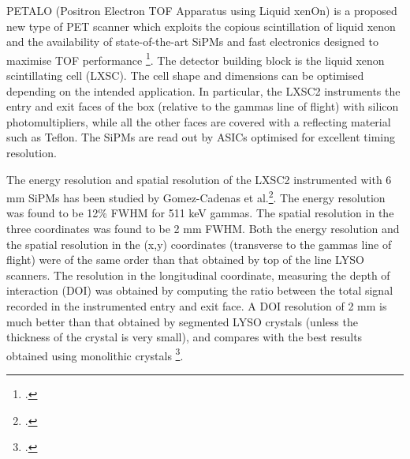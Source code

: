 
PETALO (Positron Electron TOF Apparatus using Liquid xenOn) is a proposed new type of PET scanner which exploits the copious scintillation of liquid xenon and the availability of state-of-the-art SiPMs and fast electronics designed to maximise TOF performance \footcite{Petalo2015}. The detector building block is the liquid xenon scintillating cell (LXSC). The cell shape and dimensions can be optimised depending on the intended application. In particular, the LXSC2 instruments the entry and exit faces of the box (relative to the gammas line of flight) with silicon photomultipliers, while all the other faces are covered with a reflecting material such as Teflon. The SiPMs are read out by ASICs optimised for excellent timing resolution. 
%

The energy resolution and spatial resolution of the LXSC2 instrumented with 6 mm SiPMs has been studied
by Gomez-Cadenas et al.\footcite{Petalo2015}. The energy resolution was found to be 12\% FWHM for 511 keV gammas. The spatial resolution in the three coordinates was found to be 2 mm FWHM. Both the energy resolution and the spatial resolution in the (x,y) coordinates (transverse to the gammas line of flight) were of the same order than that obtained by top of the line LYSO scanners. The resolution in the longitudinal coordinate, measuring the depth of interaction (DOI) was obtained by computing the ratio between the
total signal recorded in the instrumented entry and exit face. A DOI resolution of 2 mm is much better than that obtained by segmented LYSO crystals (unless the thickness of the crystal is very small), and compares with the best results obtained using monolithic crystals \footcite{VanDamm2011}.
%

